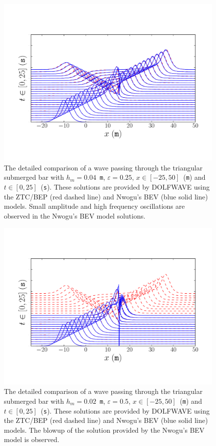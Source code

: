 \begin{figure}
\begin{center}
\includegraphics[width=\largefig]{chapters/lopes/pdf/epsilon0_25.pdf}
\end{center}
\caption{The detailed comparison of a wave passing through the
 triangular submerged bar with $h_m=0.04$~{\tt m},
 $\varepsilon=0.25$, $x\in[-25,50]$~({\tt m}) and
 $t\in[0,25]$~({\tt s}).
These solutions are provided by
 DOLFWAVE using the ZTC/BEP (red dashed line) and Nwogu's
 BEV (blue solid line) models.
Small amplitude and high frequency oscillations are observed
 in the Nwogu's BEV model solutions.}
\label{fig:lopes:znspike025}
\end{figure}
\begin{figure}
\begin{center}
\includegraphics[width=\largefig]{chapters/lopes/pdf/epsilon0_5.pdf}
\end{center}
\caption{The detailed comparison of a wave passing through the
 triangular submerged bar with $h_m=0.02$~{\tt m},
 $\varepsilon=0.5$, $x\in[-25,50]$~({\tt m}) and
 $t\in[0,25]$~({\tt s}).
These solutions are provided by
 DOLFWAVE using the ZTC/BEP (red dashed line) and Nwogu's
 BEV (blue solid line) models.
 The  blowup of the solution provided by the Nwogu's BEV model is observed.}
\label{fig:lopes:zn05}
\end{figure}

